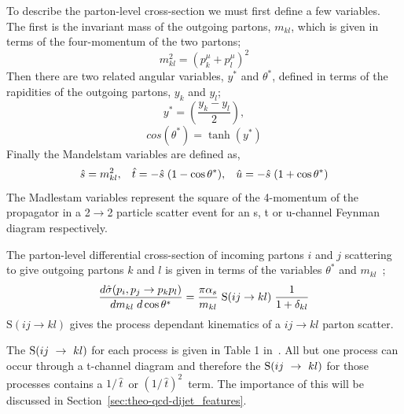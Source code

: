 To describe the parton-level cross-section we must first define a few variables.
The first is the invariant mass of the outgoing partons, $m_{kl}$, which is given in terms of the four-momentum of the two partons;
\begin{equation}
  m_{kl}^2 = (p^\mu_k + p^\mu_l)^2  
\end{equation}
\noindent
Then there are two related angular variables, $y^*$ and $\theta^*$,
defined in terms of the rapidities of the outgoing partons, $y_k$ and $y_l$;
\begin{equation}
  y^* = (\frac{y_k - y_l}{2}),
\end{equation}
\begin{equation}
  cos(\theta^*) = \tanh(y^*)
\end{equation}
\noindent
Finally the Mandelstam variables are defined as, %
\begin{equation}
  \hat{s} = m_{kl}^2, \hspace{3mm}  \hat{t} = -\hat{s}\hspace{1mm}(1 - \cos{\theta^*}), \hspace{3mm} \hat{u} = - \hat{s}\hspace{1mm}(1+\cos{\theta^*})
  \label{eqn:theo-mandy}
\end{equation}
The Madlestam variables represent the square of the 4-momentum of the propagator in a 2$\to$2 particle scatter event
for an s, t or u-channel Feynman diagram respectively.

\noindent
The parton-level differential cross-section of incoming partons $i$ and $j$ scattering to give
outgoing partons $k$ and $l$ is given in terms of the variables $\theta^*$ and $m_{kl}$~\cite{theo-dijet_harris};
\begin{equation}
  \frac{d\hat{\sigma}(p_i, p_j \to p_k p_l)}{dm_{kl}\hspace{1mm}d\cos{\theta^*}} = \frac{ \pi \alpha_s}{m_{kl}}\hspace{1mm} \text{S}(ij \to kl) \hspace{1mm} \frac{1}{1+\delta_{kl}}
  \label{eq:theo-qcd_dijet_xs}
\end{equation}
$\text{S}(ij \to kl)$ gives the process dependant kinematics of a $ij \to kl$ parton scatter.

The $\text{S}\nobreak(ij~\to~kl)$ for each process is given in Table 1 in~\cite{theo-dijet_harris}.
All but one process can occur through a t-channel diagram and therefore the 
$\text{S}\nobreak(ij~\to~kl)$ for those processes contains a $1/\,\hat{t}\,$ or $(1/\,\hat{t})^2\,$ term.
The importance of this will be discussed in Section~\ref{sec:theo-qcd-dijet_features}.

